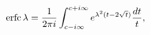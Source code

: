 \[\mathop{\mathrm{erfc}\/}\nolimits\lambda=\frac{1}{2\pi i}\int_{c-i\infty}^{c+i%
\infty}e^{\lambda^{2}(t-2\sqrt{t})}\frac{dt}{t},\]